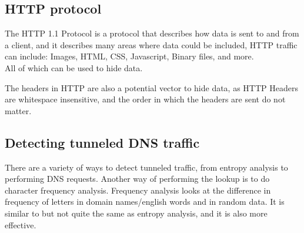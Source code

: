 \subsection{HTTP protocol}
The HTTP 1.1 Protocol\cite{rfc2616} is a protocol that describes how data is sent to and from a client, and it describes many areas where data could be included, HTTP traffic can include:
Images,
HTML,
CSS,
Javascript,
Binary files,
and more.\\
All of which can be used to hide data.\par
The headers in HTTP are also a potential vector to hide data, as HTTP Headers are whitespace insensitive, and the order in which the headers are sent do not matter\cite{rfc2616}.

\subsection{Detecting tunneled DNS traffic}
There are a variety of ways to detect tunneled traffic, from entropy analysis to performing DNS requests\cite{detectingdns}.
Another way of performing the lookup is to do character frequency analysis\cite{freqanal}.
Frequency analysis looks at the difference in frequency of letters in domain names/english words and in random data. It is similar to but not quite the same as entropy analysis, and it is also more effective\cite{freqanal}.
